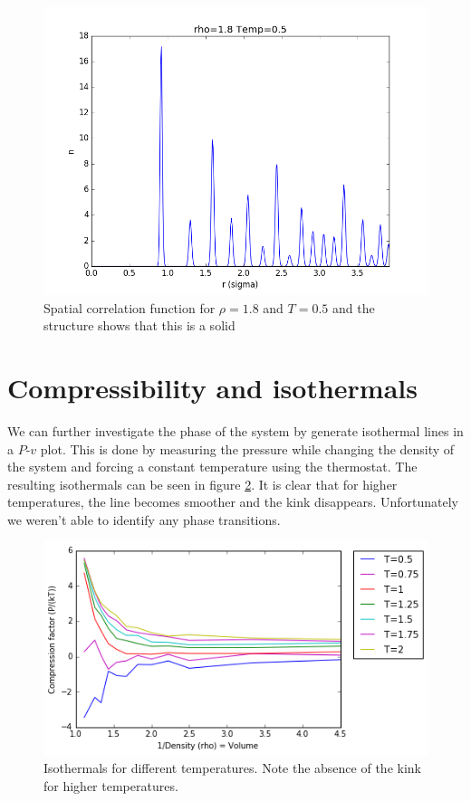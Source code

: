 \documentclass[12pt,a4paper]{report}
\begin{document}
\begin{figure}[H]
\centering
\includegraphics[scale=0.5]{Correlation_rho18_T05_rm35_2.png}
\caption{Spatial correlation function for $\rho=1.8$ and $T=0.5$ and the structure shows that this is a solid}
\label{fig:solid_cor}
\end{figure}

\section{Compressibility and isothermals}

We can further investigate the phase of the system by generate isothermal lines in a $P$-$v$ plot. This is done by measuring the pressure while changing the density of the system and forcing a constant temperature using the thermostat. The resulting isothermals can be seen in figure \ref{fig:isothermals}. It is clear that for higher temperatures, the line becomes smoother and the kink disappears. Unfortunately we weren't able to identify any phase transitions.

\begin{figure}[H]
\centering
\includegraphics[scale=0.5]{Isothermen.png}
\caption{Isothermals for different temperatures. Note the absence of the kink for higher temperatures.}
\label{fig:isothermals}
\end{figure}
\end{document}
